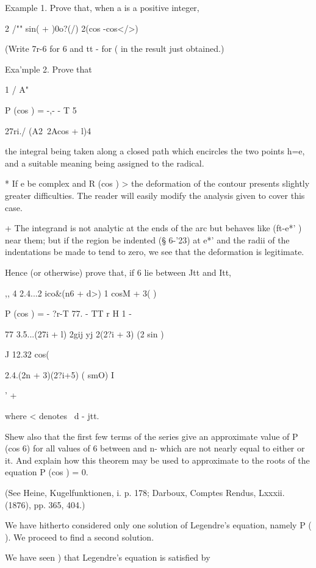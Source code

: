 {{Example 1. Prove that, when a is a positive integer,

2 /"" sin( + )0o?(/) 2(cos -cos</>)

(Write 7r-6 for 6 and tt - for ( in the result just obtained.)

Exa'mple 2. Prove that

1 / A"

P (cos ) = -,-  - T 5

27ri./ (A2\ 2Acos + l)4

the integral being taken along a closed path which encircles the two
points h=e, and a suitable meaning being assigned to the radical.

* If e be complex and R (cos ) > the deformation of the contour
presents slightly greater difficulties. The reader will easily modify
the analysis given to cover this case.

+ The integrand is not analytic at the ends of the arc but behaves
like (ft-e*' )~ near them; but if the region be indented (§ 6-'23) at
e*' and the radii of the indentations be made to tend to zero, we see
that the deformation is legitimate.

%
%

Hence (or otherwise) prove that, if 6 lie between Jtt and Itt,

,, 4 2.4...2 ico\&(n6 + d>) 1 cosM + 3( )\

P (cos ) = - ?r-T 77. - TT r H 1 -

77 3.5...(27i + l) 2gij yj 2(2?i + 3) (2 sin )

J 12.32 cos(%

2.4.(2n + 3)(2?i+5) ( smO) I

' +

where < denotes \ d - jtt.

Shew also that the first few terms of the series give an approximate
value of P (cos 6) for all values of 6 between and n- which are not
nearly equal to either or it. And explain how this theorem may be used
to approximate to the roots of the equation P (cos ) = 0.

(See Heine, Kugelfunktionen, i. p. 178; Darboux, Comptes Rendus,
Lxxxii. (1876), pp. 365, 404.)


We have hitherto considered only one solution of Legendre's equation,
namely P ( ). We proceed to find a second solution.

We have seen ) that Legendre's equation is satisfied by

}}
